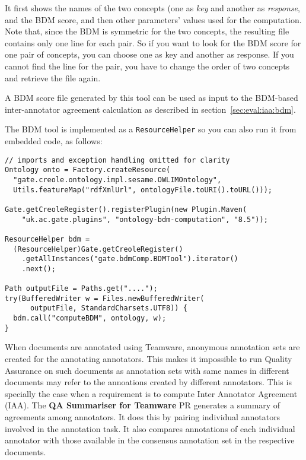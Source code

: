 It first shows the names of the two concepts (one as {\em key} and
another as {\em response}, and the BDM score, and then other
parameters' values used for the computation.  Note that, since the BDM
is symmetric for the two concepts, the resulting file contains only
one line for each pair. So if you want to look for the BDM score for
one pair of concepts, you can choose one as key and another as
response. If you cannot find the line for the pair, you have to change
the order of two concepts and retrieve the file again.

A BDM score file generated by this tool can be used as input to the BDM-based
inter-annotator agreement calculation as described in
section~\ref{sec:eval:iaa:bdm}.


The BDM tool is implemented as a \verb|ResourceHelper| so you can also run it
from embedded code, as follows:
\begin{lstlisting}
// imports and exception handling omitted for clarity
Ontology onto = Factory.createResource(
  "gate.creole.ontology.impl.sesame.OWLIMOntology",
  Utils.featureMap("rdfXmlUrl", ontologyFile.toURI().toURL()));

Gate.getCreoleRegister().registerPlugin(new Plugin.Maven(
    "uk.ac.gate.plugins", "ontology-bdm-computation", "8.5"));

ResourceHelper bdm = 
  (ResourceHelper)Gate.getCreoleRegister()
    .getAllInstances("gate.bdmComp.BDMTool").iterator()
    .next();

Path outputFile = Paths.get("....");
try(BufferedWriter w = Files.newBufferedWriter(
      outputFile, StandardCharsets.UTF8)) {
  bdm.call("computeBDM", ontology, w);
}
\end{lstlisting}


When documents are annotated using Teamware, anonymous annotation sets are 
created for the annotating annotators. This makes it impossible to run Quality 
Assurance on such documents as annotation sets with same names in different 
documents may refer to the annoations created by different annotators. This is 
specially the case when a requirement is to compute Inter Annotator Agreement 
(IAA). The \textbf{QA Summariser for Teamware} PR generates a summary of 
agreements among annotators. It does this by pairing individual annotators 
involved in the annotation task. It also compares annotations of each individual
annotator with those available in the consensus annotation set in the respective
documents.

